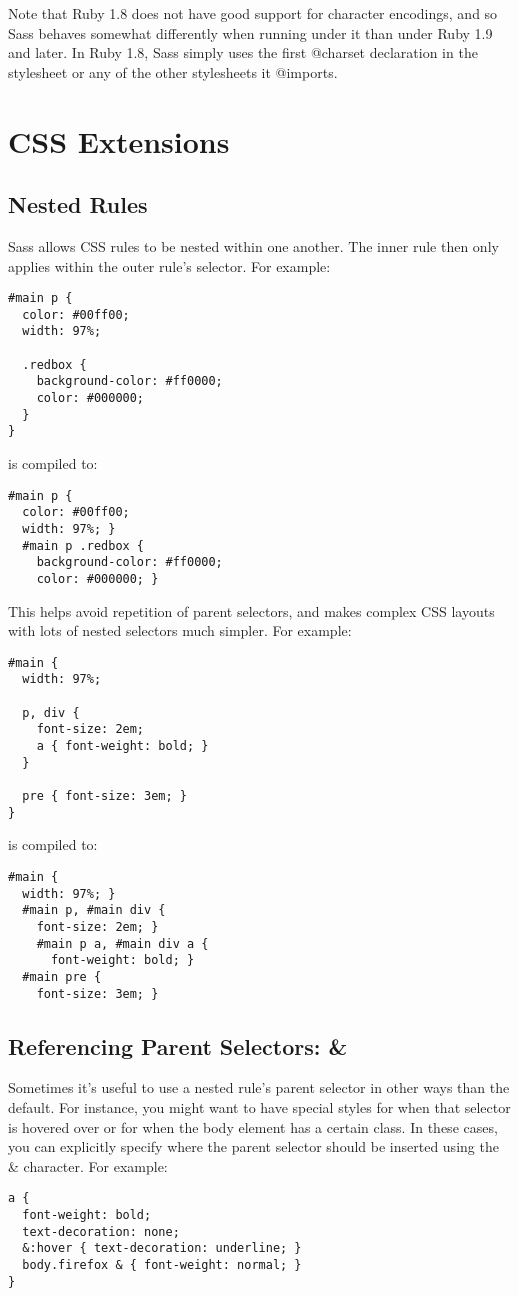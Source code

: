 \documentclass[9pt]{article}
\begin{document}
 Note that Ruby 1.8 does not have good support for character encodings, and so Sass behaves somewhat differently when running under it than under Ruby 1.9 and later. In Ruby 1.8, Sass simply uses the first @charset declaration in the stylesheet or any of the other stylesheets it @imports.
\section{CSS Extensions}
\subsection{Nested Rules}


 Sass allows CSS rules to be nested within one another. The inner rule then only applies within the outer rule’s selector. For example:
\begin{verbatim}
#main p {
  color: #00ff00;
  width: 97%;

  .redbox {
    background-color: #ff0000;
    color: #000000;
  }
}
\end{verbatim}


 is compiled to:
\begin{verbatim}
#main p {
  color: #00ff00;
  width: 97%; }
  #main p .redbox {
    background-color: #ff0000;
    color: #000000; }
\end{verbatim}


 This helps avoid repetition of parent selectors, and makes complex CSS layouts with lots of nested selectors much simpler. For example:
\begin{verbatim}
#main {
  width: 97%;

  p, div {
    font-size: 2em;
    a { font-weight: bold; }
  }

  pre { font-size: 3em; }
}
\end{verbatim}


 is compiled to:
\begin{verbatim}
#main {
  width: 97%; }
  #main p, #main div {
    font-size: 2em; }
    #main p a, #main div a {
      font-weight: bold; }
  #main pre {
    font-size: 3em; }
\end{verbatim}
\subsection{Referencing Parent Selectors: \&}


 Sometimes it’s useful to use a nested rule’s parent selector in other ways than the default. For instance, you might want to have special styles for when that selector is hovered over or for when the body element has a certain class. In these cases, you can explicitly specify where the parent selector should be inserted using the \& character. For example:
\begin{verbatim}
a {
  font-weight: bold;
  text-decoration: none;
  &:hover { text-decoration: underline; }
  body.firefox & { font-weight: normal; }
}
\end{verbatim}
\end{document}
